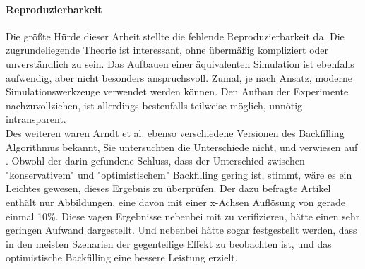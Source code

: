 \paragraph{Reproduzierbarkeit}
Die größte Hürde dieser Arbeit stellte die fehlende Reproduzierbarkeit da. Die zugrundeliegende Theorie ist interessant, ohne übermäßig kompliziert oder unverständlich zu sein. Das Aufbauen einer äquivalenten Simulation ist ebenfalls aufwendig, aber nicht besonders anspruchsvoll. Zumal, je nach Ansatz, moderne Simulationswerkzeuge verwendet werden können.
Den Aufbau der Experimente nachzuvollziehen, ist allerdings bestenfalls teilweise möglich, unnötig intransparent. \\
Des weiteren waren Arndt et al. ebenso verschiedene Versionen des Backfilling Algorithmus bekannt, Sie untersuchten die Unterschiede nicht, und verwiesen auf \cite{optVsCons}. Obwohl der darin gefundene Schluss, dass der Unterschied zwischen "konservativem" und "optimistischem" Backfilling gering ist, stimmt, wäre es ein Leichtes gewesen, dieses Ergebnis zu überprüfen. Der dazu befragte Artikel enthält nur Abbildungen, eine davon mit einer x-Achsen Auflösung von gerade einmal 10\%. Diese vagen Ergebnisse nebenbei mit zu verifizieren, hätte einen sehr geringen Aufwand dargestellt. Und nebenbei hätte sogar festgestellt werden, dass in den meisten Szenarien der gegenteilige Effekt zu beobachten ist, und das optimistische Backfilling eine bessere Leistung erzielt.

